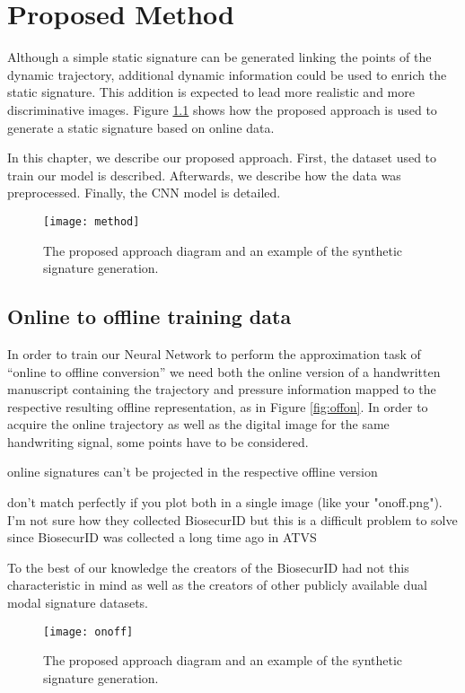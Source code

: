 
\chapter{Proposed Method}\label{ch:method}


Although a simple static signature can be generated linking the points of the dynamic trajectory, additional dynamic information could be used to enrich the static signature. This addition is expected to lead more realistic and more discriminative images. Figure \ref{fig_approach} shows how the proposed approach is used to generate a static signature based on online data. 

In this chapter, we describe our proposed approach. First, the dataset used to train our model is described. Afterwards, we describe how the data was preprocessed. Finally, the CNN model is detailed. 

\begin{figure}[!htb]
\centering
\texttt{[image: method]}
\caption{The proposed approach diagram and an example of the synthetic signature generation.}
\label{fig_approach}
\end{figure}

\section{Online to offline training data}
In order to train our Neural Network to perform the approximation task of ``online to offline conversion'' we need both the online version of a handwritten manuscript containing the trajectory and pressure information mapped to the respective resulting offline representation, as in Figure \ref{fig:offon}. In order to acquire the online trajectory as well as the digital image for the same handwriting signal, some points have to be considered.

online signatures can't be projected in the respective offline version

don't match perfectly if you plot both in a single image (like your "onoff.png"). I'm not sure how they collected BiosecurID but this is a difficult problem to solve since BiosecurID was collected a long time ago in ATVS 

To the best of our knowledge the creators of the BiosecurID had not this characteristic in mind as well as the creators of other \cite{biomet, myidea, sigcomp2009, sigma, sigwicomp2013, sigwicomp2015} publicly available dual modal signature datasets.
\begin{figure}[!htb]
\centering
\texttt{[image: onoff]}
\caption{The proposed approach diagram and an example of the synthetic signature generation.}
\label{fig:onoff}
\end{figure}


